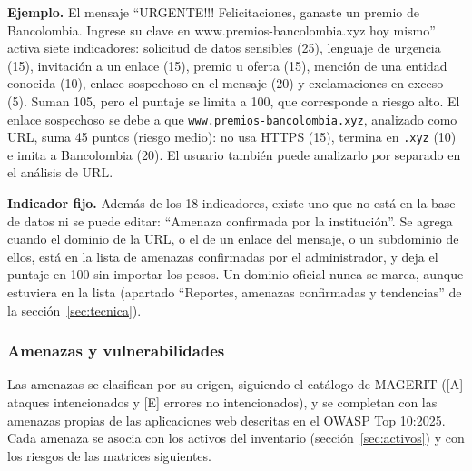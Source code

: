 \documentclass[journal,onecolumn,12pt,draftclsnofoot]{IEEEtran}
\begin{document}
\textbf{Ejemplo.} El mensaje ``URGENTE!!! Felicitaciones, ganaste un premio de Bancolombia. Ingrese su clave en www.premios-bancolombia.xyz hoy mismo'' activa siete indicadores: solicitud de datos sensibles (25), lenguaje de urgencia (15), invitación a un enlace (15), premio u oferta (15), mención de una entidad conocida (10), enlace sospechoso en el mensaje (20) y exclamaciones en exceso (5). Suman 105, pero el puntaje se limita a 100, que corresponde a riesgo alto. El enlace sospechoso se debe a que \texttt{www.premios-bancolombia.xyz}, analizado como URL, suma 45 puntos (riesgo medio): no usa HTTPS (15), termina en \texttt{.xyz} (10) e imita a Bancolombia (20). El usuario también puede analizarlo por separado en el análisis de URL.

\textbf{Indicador fijo.} Además de los 18 indicadores, existe uno que no está en la base de datos ni se puede editar: ``Amenaza confirmada por la institución''. Se agrega cuando el dominio de la URL, o el de un enlace del mensaje, o un subdominio de ellos, está en la lista de amenazas confirmadas por el administrador, y deja el puntaje en 100 sin importar los pesos. Un dominio oficial nunca se marca, aunque estuviera en la lista (apartado ``Reportes, amenazas confirmadas y tendencias'' de la sección~\ref{sec:tecnica}).

\subsubsection{Amenazas y vulnerabilidades}\label{sec:amenazas}

Las amenazas se clasifican por su origen, siguiendo el catálogo de MAGERIT ([A] ataques intencionados y [E] errores no intencionados), y se completan con las amenazas propias de las aplicaciones web descritas en el OWASP Top 10:2025. Cada amenaza se asocia con los activos del inventario (sección~\ref{sec:activos}) y con los riesgos de las matrices siguientes.
\end{document}
